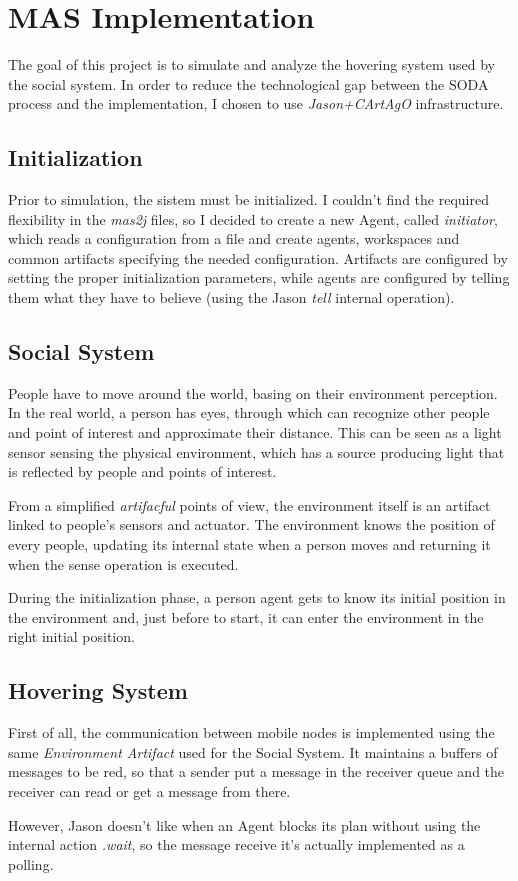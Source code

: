 \section{MAS Implementation}

The goal of this project is to simulate and analyze the
hovering system used by the social system. In order to
reduce the technological gap between the SODA process and
the implementation, I chosen to use \emph{Jason+CArtAgO}
infrastructure.

\subsection{Initialization}
Prior to simulation, the sistem must be initialized. I couldn't find the
required flexibility in the \emph{mas2j} files, so I decided to create a new
Agent, called \emph{initiator}, which reads a configuration from a file and
create agents, workspaces and common artifacts specifying the needed configuration.
Artifacts are configured by setting the proper initialization parameters, while
agents are configured by telling them what they have to believe (using the
Jason \emph{tell} internal operation).

\subsection{Social System}
People have to move around the world, basing on
their environment perception. In the real world,
a person has eyes, through which can recognize other
people and point of interest and approximate their distance.
This can be seen as a light sensor sensing the
physical environment, which has a source producing light
that is reflected by people and points of interest.

From a simplified \emph{artifacful} points of view, the
environment itself is an artifact linked to people's
sensors and actuator. The environment knows the position of
every people, updating its internal state when a person moves
and returning it when the sense operation is executed.

During the initialization phase, a person agent gets to know
its initial position in the environment and, just before to start,
it can enter the environment in the right initial position.

\subsection{Hovering System}

First of all, the communication between mobile nodes is implemented using
the same \emph{Environment Artifact} used for the Social System. It
maintains a buffers of messages to be red, so that a sender put a message
in the receiver queue and the receiver can read or get a message from there.

However, Jason doesn't like when an Agent blocks its plan without using the
internal action \emph{.wait}, so the message receive it's actually implemented
as a polling.